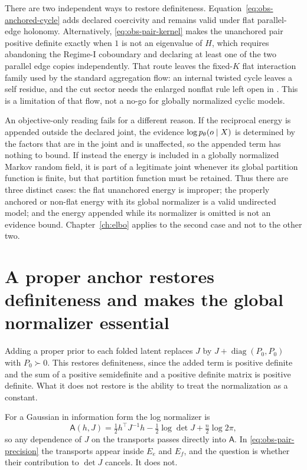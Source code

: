 There are two independent ways to restore definiteness.
Equation~\eqref{eq:obs-anchored-cycle} adds declared coercivity and remains
valid under flat parallel-edge holonomy. Alternatively,
\eqref{eq:obs-pair-kernel} makes the unanchored pair positive definite
exactly when \(1\) is not an eigenvalue of \(H\), which requires abandoning
the Regime-I coboundary and declaring at least one of the two parallel edge
copies independently. That route leaves the fixed-\(K\) flat interaction
family used by the standard aggregation flow: an internal twisted cycle
leaves a self residue, and the cut sector needs the enlarged nonflat rule
left open in . This is a limitation of that flow,
not a no-go for globally normalized cyclic models. 

An objective-only reading fails for a different reason. If the reciprocal energy is appended outside the declared joint, the evidence $\log p_\theta(o\mid X)$ is determined by the factors that are in the joint and is unaffected, so the appended term has nothing to bound. If instead the energy is included in a globally normalized Markov random field, it is part of a legitimate joint whenever its global partition function is finite, but that partition function must be retained. Thus there are three distinct cases: the flat unanchored energy is improper; the properly anchored or non-flat energy with its global normalizer is a valid undirected model; and the energy appended while its normalizer is omitted is not an evidence bound. Chapter~\ref{ch:elbo} applies to the second case and not to the other two. 

\section{A proper anchor restores definiteness and makes the global normalizer essential}
\label{sec:obs-selfprior}

Adding a proper prior to each folded latent replaces $J$ by $J+\operatorname{diag}(P_0,P_0)$ with $P_0\succ0$. This restores definiteness, since the added term is positive definite and the sum of a positive semidefinite and a positive definite matrix is positive definite. What it does not restore is the ability to treat the normalization as a constant.

For a Gaussian in information form the log normalizer is
\begin{equation}
\mathsf A(h,J)=\tfrac12 h^{\top}J^{-1}h-\tfrac12\log\det J+\tfrac{n}{2}\log 2\pi,
\label{eq:obs-log-normalizer}
\end{equation}
so any dependence of $J$ on the transports passes directly into $\mathsf A$. In \eqref{eq:obs-pair-precision} the transports appear inside $E_e$ and $E_f$, and the question is whether their contribution to $\det J$ cancels. It does not.

